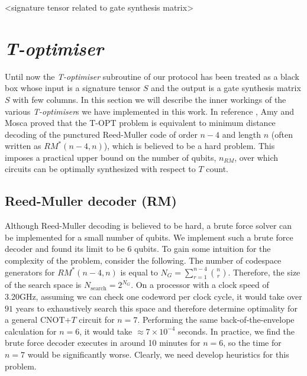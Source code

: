 \documentclass[notitlepage]{article}
\theoremstyle{definition}
\theoremstyle{problem}
\theoremstyle{lemma}
\begin{document}
<signature tensor related to gate synthesis matrix> \fi

\section{\emph{T-optimiser}}
\label{s_topt}
Until now the \emph{T-optimiser} subroutine of our protocol has been treated as a black box whose input is a signature tensor $S$ and the output is a gate synthesis matrix $S$ with few columns. In this section we will describe the inner workings of the various \emph{T-optimiser}s we have implemented in this work. In reference \cite{3_Amy_2016}, Amy and Mosca proved that the T-OPT problem is equivalent to minimum distance decoding of the punctured Reed-Muller code of order $n-4$ and length $n$ (often written as $RM^*(n-4, n)$), which is believed to be a hard problem. This imposes a practical upper bound on the number of qubits, $n_{RM}$, over which circuits can be optimally synthesized with respect to $T$ count.

\subsection{Reed-Muller decoder (RM)}
Although Reed-Muller decoding is believed to be hard, a brute force solver can be implemented for a small number of qubits. We implement such a brute force decoder and found its limit to be 6 qubits.
To gain some intuition for the complexity of the problem, consider the following. The number of codespace generators for $RM^*(n-4, n)$ is equal to $N_G = \sum_{r=1}^{n-4}{{n}\choose{r}}$.
Therefore, the size of the search space is $N_{\text{search}} = 2^{N_G}$. On a processor with a clock speed of 3.20GHz, assuming we can check one codeword per clock cycle, it would take over $91$ years to exhaustively search this space and therefore determine optimality for a general CNOT+$T$ circuit for $n=7$. Performing the same back-of-the-envelope calculation for $n=6$, it would take $\approx 7\times 10^{-4}$ seconds. In practice, we find the brute force decoder executes in around 10 minutes for $n=6$, so the time for $n=7$ would be significantly worse. Clearly, we need develop heuristics for this problem.
\end{document}
